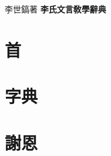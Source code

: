 \documentclass[a5paper,12pt]{ltjtbook}
\begin{document}
\begin{titlepage}
\textcolor{wh}
\hfill
\vfill
\vfill
{\fontsize{4mm}{4mm}\selectfont\textcolor{wh}{李世鎬\hspace{10mm}著}}
\vspace{24pt}\newline
{\fontsize{12mm}{12mm}\bfseries\selectfont\textcolor{wh}{\hspace{10mm}李氏文言敎學辭典}}
\vfill
\end{titlepage}
\newpage
\chapter*{首}
\onehalfspacing
\flushleft

\chapter*{字典}
\onehalfspacing
\flushleft

\chapter*{謝恩}
\onehalfspacing
\flushleft

\end{document}
